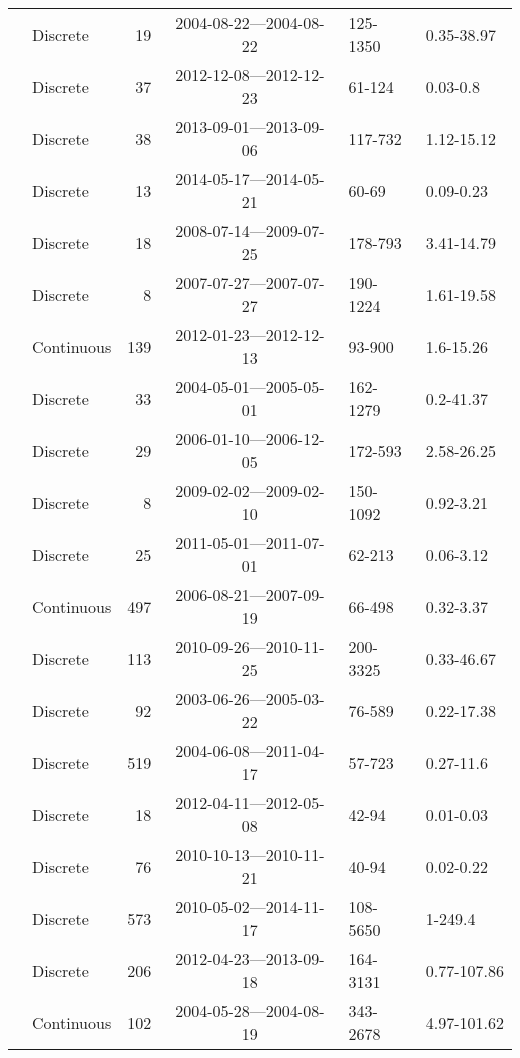 \begin{longtable}{llrcll}
  \citet{Forsstrom2015} & Discrete &  19 & 2004-08-22---2004-08-22 & 125-1350 & 0.35-38.97 \\ 
  \citet{Galgani2016} & Discrete &  37 & 2012-12-08---2012-12-23 & 61-124 & 0.03-0.8 \\ 
  \citet{Goncalves2015} & Discrete &  38 & 2013-09-01---2013-09-06 & 117-732 & 1.12-15.12 \\ 
  \citet{Gonnelli2016} & Discrete &  13 & 2014-05-17---2014-05-21 & 60-69 & 0.09-0.23 \\ 
  \citet{Griffin2011} & Discrete &  18 & 2008-07-14---2009-07-25 & 178-793 & 3.41-14.79 \\ 
  \citet{Gueguen2011} & Discrete &   8 & 2007-07-27---2007-07-27 & 190-1224 & 1.61-19.58 \\ 
  \citet{Heinz2015} & Continuous & 139 & 2012-01-23---2012-12-13 & 93-900 & 1.6-15.26 \\ 
  \citet{Helms2008} & Discrete &  33 & 2004-05-01---2005-05-01 & 162-1279 & 0.2-41.37 \\ 
  \citet{Hernes2008} & Discrete &  29 & 2006-01-10---2006-12-05 & 172-593 & 2.58-26.25 \\ 
  \citet{Hong2012} & Discrete &   8 & 2009-02-02---2009-02-10 & 150-1092 & 0.92-3.21 \\ 
  \citet{Hur2014} & Discrete &  25 & 2011-05-01---2011-07-01 & 62-213 & 0.06-3.12 \\ 
  \citet{kattegat} & Continuous & 497 & 2006-08-21---2007-09-19 & 66-498 & 0.32-3.37 \\ 
  \citet{Kellerman2015} & Discrete & 113 & 2010-09-26---2010-11-25 & 200-3325 & 0.33-46.67 \\ 
  \citet{Kowalczuk2010} & Discrete &  92 & 2003-06-26---2005-03-22 & 76-589 & 0.22-17.38 \\ 
  \citet{Kowalczuk2010a} & Discrete & 519 & 2004-06-08---2011-04-17 & 57-723 & 0.27-11.6 \\ 
  \citet{Kowalczuk2012} & Discrete &  18 & 2012-04-11---2012-05-08 & 42-94 & 0.01-0.03 \\ 
  \citet{Kowalczuk2013} & Discrete &  76 & 2010-10-13---2010-11-21 & 40-94 & 0.02-0.22 \\ 
  \citet{Lambert2015a} & Discrete & 573 & 2010-05-02---2014-11-17 & 108-5650 & 1-249.4 \\ 
  \citet{Loken2016} & Discrete & 206 & 2012-04-23---2013-09-18 & 164-3131 & 0.77-107.86 \\ 
  \citet{lter2004} & Continuous & 102 & 2004-05-28---2004-08-19 & 343-2678 & 4.97-101.62 \\ 

\end{longtable}
